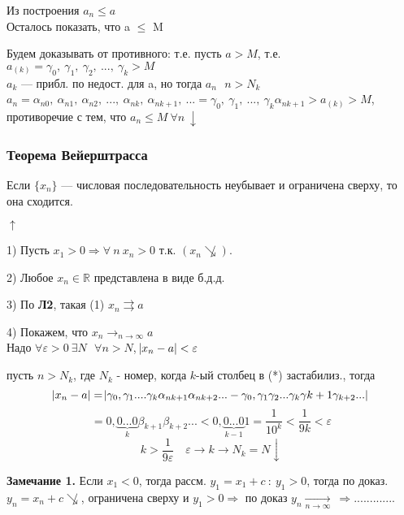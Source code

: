 \documentclass{article}
\begin{document}
    Из построения \(a_n \leq a \)
    \\ Осталось показать, что a \(\leq\) M

    Будем доказывать от противного: т.е. пусть \(a > M\), т.е. \(a_{(k)} = \gamma_0,\ \gamma_1,\ \gamma_2,\ ...,\ \gamma_k > M\)
    \\ \(a_k\) --- прибл. по недост. для a, но тогда \(a_n \ \: \ n > N_k\)
    \\ \(a_n = \alpha_{n0},\ \alpha_{n1},\ \alpha_{n2},\ ...,\ \alpha_{nk},\ \alpha_{nk+1},\ ... = \gamma_0,\ \gamma_1,\ ...,\ \gamma_k\alpha_{nk+1} > a_{(k)} > M\), противоречие с тем, что \(a_n \leq M \ \forall n \ \downarrow\)

    \subsubsection{Теорема Вейерштрасса}

    Если \(\{ x_n \} \) --- числовая последовательность неубывает и ограничена сверху, то она сходится.

    \(\uparrow\)

    1) Пусть \( x_1 > 0 \Rightarrow \forall\ n\ x_n > 0 \) т.к. \( (x_n \not\searrow ) \).

    2) Любое \( x_n \in \mathbb{R} \) представлена в виде б.д.д.

    3) По \textbf{Л2}, такая (1) \( x_n \rightrightarrows a \)

    4) Покажем, что \(x_n \longrightarrow_{n \rightarrow \infty} a\)
    \\ Надо \(\forall \varepsilon > 0 \ \exists N \ \: \ \forall n > N\), \(\abs{x_n - a} < \varepsilon\)

    пусть \( n > N_k \), где \( N_k \) - номер, когда \(k\)-ый столбец в (*) застабилиз., тогда 
    \[ \abs{x_n - a} = \abs{\gamma_0,\gamma_1....\gamma_k\alpha_{nk+1}\alpha_{nk+2}... - \gamma_0,\gamma_1\gamma_2...\gamma_k\gamma{k+1}\gamma_{k+2}...} \]
    \[ = 0,\underbrace{0...0}_k\beta_{k+1}\beta_{k+2}... < 0,\underbrace{0...0}_{k-1}1 = \frac{1}{10^k} < \frac{1}{9k} < \varepsilon \]
    \[k > \frac{1}{9\varepsilon}\quad \varepsilon \rightarrow k \rightarrow N_k = N \downarrow \]
    
    \textbf{Замечание 1.} 
    Если \(x_1 < 0\), тогда рассм. \(y_1 = x_1 + c\ : \ y_1 > 0\), тогда по доказ. \( y_n = x_n + c \not\searrow \), ограничена сверху и \( y_1 > 0 \Rightarrow \) по доказ \(y_n \xrightarrow[n \rightarrow \infty]{}\ \Rightarrow ............. \)
    
\end{document}
